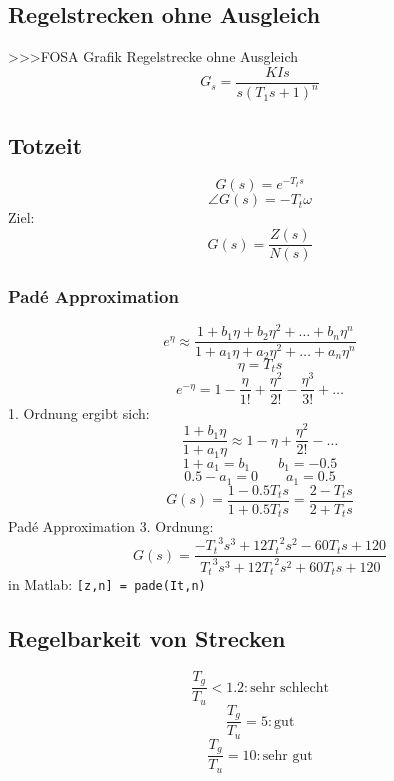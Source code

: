 \subsection{Regelstrecken ohne Ausgleich}
>>>FOSA Grafik Regelstrecke ohne Ausgleich
\[ G_s = \frac{KIs}{s (T_1 s + 1)^n} \]

\subsection{Totzeit}
\[ G(s) = e^{-T_t s} \]
\[ \angle G(s) = -T_t \omega \]
Ziel: 
\[ G(s) = \frac{Z(s)}{N(s)} \]

\subsubsection{Padé Approximation}
\[ e^{\eta} \approx \frac{1 + b_1 \eta + b_2 \eta^2 + \ldots + b_n \eta^n}
{1 + a_1 \eta + a_2 \eta^2 + \ldots +  a_n \eta^n} \]
\[ \eta = T_t s \]
\[ e^{-\eta} = 1 - \frac{\eta}{1!} + \frac{\eta^2}{2!} - \frac{\eta^3}{3!} + \ldots \]
1. Ordnung ergibt sich: 
\[ \frac{1 + b_1 \eta}{1 + a_1 \eta} \approx 1 - \eta + \frac{\eta^2}{2!} - \ldots \]
\[ 1 + a_1 = b_1 \qquad b_1 = -0.5 \]
\[ 0.5 - a_1 = 0 \qquad a_1 = 0.5 \]
\[ G(s)  = \frac{1 - 0.5 T_t s}{1 + 0.5 T_t s} = \frac{2 - T_t s}{2 + T_t s} \]
Padé Approximation 3. Ordnung: 
\[ G(s) = \frac{-{T_t}^3 s^3 + 12 {T_t}^2 s^2 - 60 T_t s + 120}
{{T_t}^3 s^3 + 12 {T_t}^2 s^2 + 60 T_t s + 120} \]
in Matlab: \verb?[z,n] = pade(It,n)?

\subsection{Regelbarkeit von Strecken}
\[ \frac{T_g}{T_u} < 1.2: \text{sehr schlecht} \]
\[ \frac{T_g}{T_u} = 5: \text{gut} \]
\[ \frac{T_g}{T_u} = 10: \text{sehr gut} \]

